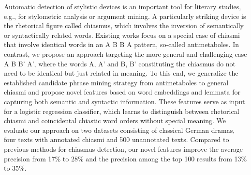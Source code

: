 Automatic detection of stylistic devices is an important tool for literary studies, e.g., for stylometric analysis or argument mining. A particularly striking device is the rhetorical figure called chiasmus, which involves the inversion of semantically or syntactically related words. Existing works focus on a special case of chiasmi that involve identical words in an A B B A pattern, so-called antimetaboles. In contrast, we propose an approach targeting the more general and challenging case A B B' A', where the words A, A' and B, B' constituting the chiasmus do not need to be identical but just related in meaning. To this end, we generalize the established candidate phrase mining strategy from antimetaboles to general chiasmi and propose novel features based on word embeddings and lemmata for capturing both semantic and syntactic information. These features serve as input for a logistic regression classifier, which learns to distinguish between rhetorical chiasmi and coincidental chiastic word orders without special meaning. We evaluate our approach on two datasets consisting of classical German dramas, four texts with annotated chiasmi and 500 unannotated texts. Compared to previous methods for chiasmus detection, our novel features improve the average precision from 17\% to 28\% and the precision among the top 100 results from 13\% to 35\%.
